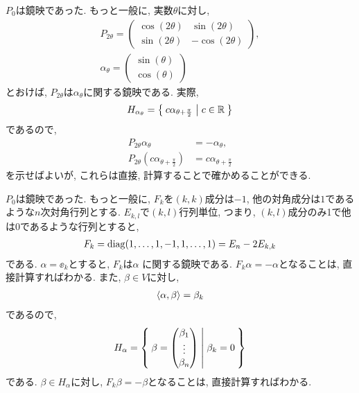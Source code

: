 \begin{example}
  \label{ex:i2m:ref}
  $P_0$は鏡映であった.
  もっと一般に,
  実数$\theta$に対し,
\begin{align*}
  P_{2\theta}=
  \begin{pmatrix}
    \cos(2\theta) & \sin(2\theta) \\
    \sin(2\theta) & -\cos(2\theta) 
  \end{pmatrix},\\
  \alpha_\theta
  =
  \begin{pmatrix}
    \sin(\theta) \\
    \cos(\theta) 
  \end{pmatrix}
\end{align*}
とおけば, $P_{2\theta}$は$\alpha_\theta$に関する鏡映である.
実際,
\begin{align*}
  H_{\alpha_{\theta}} = \Set{c \alpha_{\theta+\frac{\pi}{2}}|c\in \mathbb{R}} 
\end{align*}
であるので,
\begin{align*}
  P_{2\theta}\alpha_{\theta} &= - \alpha_{\theta},\\
  P_{2\theta}(c\alpha_{\theta+\frac{\pi}{2}}) &= c\alpha_{\theta+\frac{\pi}{2}}
\end{align*}
を示せばよいが, これらは直接, 計算することで確かめることができる.
\end{example}


\begin{example}
  \label{ex:a1n:refl}
  $P_0$は鏡映であった.
  もっと一般に,
  $F_k$を$(k,k)$成分は$-1$, 他の対角成分は$1$であるような$n$次対角行列とする.
 $E_{k,l}$で$(k,l)$行列単位, つまり, $(k,l)$成分のみ1で他は0であるような行列とすると,
  \begin{align*}
    F_k = \operatorname{diag}(1,\ldots,1,-1,1,\ldots,1)=E_n-2E_{k,k}
  \end{align*}
  である.
  $\alpha=\ee_k$とすると, $F_k$は$\alpha$ に関する鏡映である.
  $F_k \alpha = -\alpha$となることは, 直接計算すればわかる.
  また, $\beta\in V$に対し,
  \begin{align*}
    \Braket{\alpha,\beta}= \beta_k 
  \end{align*}
  であるので,
  \begin{align*}
    H_\alpha = \Set{
      \beta=
      \begin{pmatrix}
        \beta_1\\
        \vdots\\
        \beta_n
      \end{pmatrix}
      | \beta_k=0}
  \end{align*}
  である.  $\beta\in H_\alpha$に対し, 
  $F_k \beta = -\beta$となることは, 直接計算すればわかる.
\end{example}

